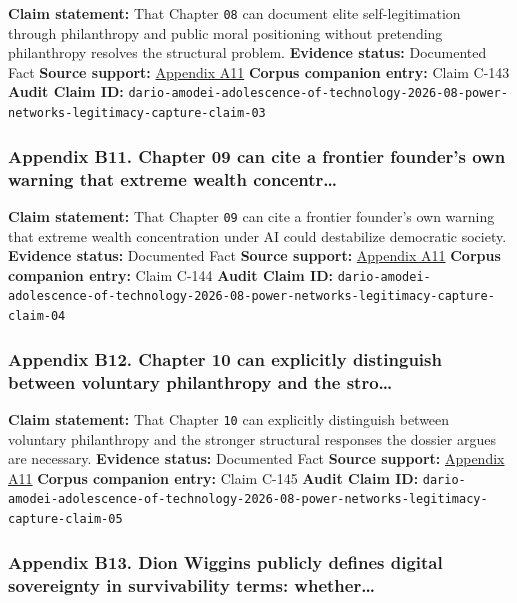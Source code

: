 \documentclass[
  american,
  11pt,
  letterpaper,
]{article}
\begin{document}
\textbf{Claim statement:} That Chapter \texttt{08} can document elite
self-legitimation through philanthropy and public moral positioning
without pretending philanthropy resolves the structural problem.
\textbf{Evidence status:} Documented Fact \textbf{Source support:}
\hyperref[ch-09-appendix-a11-the-adolescence-of-technology]{Appendix
A11} \textbf{Corpus companion entry:} Claim C-143 \textbf{Audit Claim
ID:}
\texttt{dario-amodei-adolescence-of-technology-2026-08-power-networks-legitimacy-capture-claim-03}

\subsubsection{Appendix B11. Chapter 09 can cite a frontier founder's
own warning that extreme wealth
concentr\ldots{}}\label{ch-09-appendix-b11-chapter-09-can-cite-a-frontier-founder-s-own-warning-that-extreme-wealth-concentr}

\textbf{Claim statement:} That Chapter \texttt{09} can cite a frontier
founder's own warning that extreme wealth concentration under AI could
destabilize democratic society. \textbf{Evidence status:} Documented
Fact \textbf{Source support:}
\hyperref[ch-09-appendix-a11-the-adolescence-of-technology]{Appendix
A11} \textbf{Corpus companion entry:} Claim C-144 \textbf{Audit Claim
ID:}
\texttt{dario-amodei-adolescence-of-technology-2026-08-power-networks-legitimacy-capture-claim-04}

\subsubsection{Appendix B12. Chapter 10 can explicitly distinguish
between voluntary philanthropy and the
stro\ldots{}}\label{ch-09-appendix-b12-chapter-10-can-explicitly-distinguish-between-voluntary-philanthropy-and-the-stro}

\textbf{Claim statement:} That Chapter \texttt{10} can explicitly
distinguish between voluntary philanthropy and the stronger structural
responses the dossier argues are necessary. \textbf{Evidence status:}
Documented Fact \textbf{Source support:}
\hyperref[ch-09-appendix-a11-the-adolescence-of-technology]{Appendix
A11} \textbf{Corpus companion entry:} Claim C-145 \textbf{Audit Claim
ID:}
\texttt{dario-amodei-adolescence-of-technology-2026-08-power-networks-legitimacy-capture-claim-05}

\subsubsection{Appendix B13. Dion Wiggins publicly defines digital
sovereignty in survivability terms:
whether\ldots{}}\label{ch-09-appendix-b13-dion-wiggins-publicly-defines-digital-sovereignty-in-survivability-terms-whether}
\end{document}
